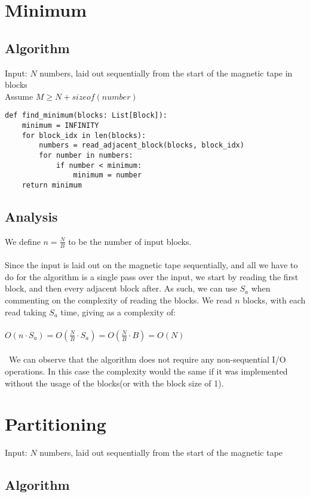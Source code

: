\documentclass{article}
\begin{document}
\section*{Minimum}
\subsection*{Algorithm}
Input: $N$ numbers, laid out sequentially from the start of the magnetic tape in blocks \\
Assume $M \geq N + sizeof(number)$

\begin{verbatim}
def find_minimum(blocks: List[Block]):
    minimum = INFINITY
    for block_idx in len(blocks):
        numbers = read_adjacent_block(blocks, block_idx)
        for number in numbers:
            if number < minimum:
                minimum = number
    return minimum
\end{verbatim}

\subsection*{Analysis}
We define $n = \frac{N}{B}$ to be the number of input blocks. \\\\
Since the input is laid out on the magnetic tape sequentially, and all we have to do for the algorithm is a single pass over the input, we start by reading the first block, and then every adjacent block after. As such, we can use $S_a$ when commenting on the complexity of reading the blocks. We read $n$ blocks, with each read taking $S_a$ time, giving as a complexity of: \\\\
$O(n \cdot S_a) = O(\frac{N}{B} \cdot S_a) = O(\frac{N}{B} \cdot B) = O(N)$\\\\
\
We can observe that the algorithm does not require any non-sequential I/O operations. In this case the complexity would the same if it was implemented without the usage of the blocks(or with the block size of 1). 

\section*{Partitioning}
Input: $N$ numbers, laid out sequentially from the start of the magnetic tape

\subsection*{Algorithm}
\end{document}
